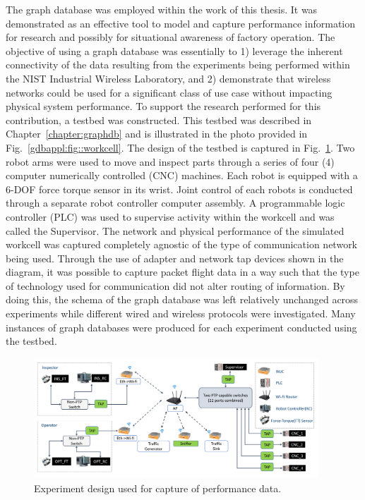 The graph database was employed within the work of this thesis.  It was demonstrated as an effective tool to model and capture performance information for research and possibly for situational awareness of factory operation.  The objective of using a graph database was essentially to 1) leverage the inherent connectivity of the data resulting from the experiments being performed within the NIST Industrial Wireless Laboratory, and 2) demonstrate that wireless networks could be used for a significant class of use case without impacting physical system performance. To support the research performed for this contribution, a testbed was constructed. This testbed was described in Chapter~\ref{chapter:graphdb} and is illustrated in the photo provided in Fig.~\ref{gdbappl:fig::workcell}.  The design of the testbed is captured in Fig.~\ref{fig:concl:experiment-design}.  Two robot arms were used to move and inspect parts through a series of four (4) computer numerically controlled (CNC) machines.  Each robot is equipped with a 6-DOF force torque sensor in its wrist.  Joint control of each robots is conducted through a separate robot controller computer assembly.  A programmable logic controller (PLC) was used to supervise activity within the workcell and was called the Supervisor.  The network and physical performance of the simulated workcell was captured completely agnostic of the type of communication network being used.  Through the use of adapter and network tap devices shown in the diagram, it was possible to capture packet flight data in a way such that the type of technology used for communication did not alter routing of information.  By doing this, the schema of the graph database was left relatively unchanged across experiments while different wired and wireless protocols were investigated. Many instances of graph databases were produced for each experiment conducted using the testbed.  

\begin{figure}[!ht]
	\centering
	\includegraphics[width=0.95\textwidth]{chapter-gdb-appl/figures/Fig1TiiSpecialDiagram-testbed2.png}
	\caption{Experiment design used for capture of performance data.}
	\label{fig:concl:experiment-design}
\end{figure}


